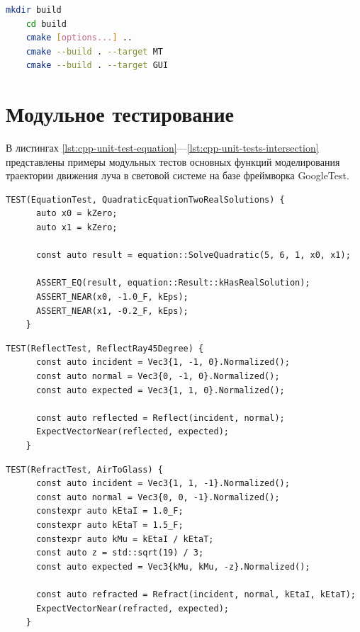 \begin{lstlisting}[gobble=8, language=bash, caption={Сборка\label{lst:cmake}}]
	mkdir build
	cd build
	cmake [options...] ..
	cmake --build . --target MT
	cmake --build . --target GUI
\end{lstlisting}

\section{Модульное тестирование}

В листингах \ref{lst:cpp-unit-test-equation}—\ref{lst:cpp-unit-tests-intersection} представлены примеры модульных тестов основных функций моделирования траектории движения луча в световой системе на базе фреймворка GoogleTest.

\begin{lstlisting}[gobble=8, language=C++23, caption={Юнит-тест функции решения квадратных уравнений\label{lst:cpp-unit-test-equation}}]
	TEST(EquationTest, QuadraticEquationTwoRealSolutions) {
	  auto x0 = kZero;
	  auto x1 = kZero;

	  const auto result = equation::SolveQuadratic(5, 6, 1, x0, x1);

	  ASSERT_EQ(result, equation::Result::kHasRealSolution);
	  ASSERT_NEAR(x0, -1.0_F, kEps);
	  ASSERT_NEAR(x1, -0.2_F, kEps);
	}
\end{lstlisting}

\begin{lstlisting}[gobble=8, language=C++23, caption={Юнит-тест функции отражения\label{lst:cpp-unit-test-reflection}}]
	TEST(ReflectTest, ReflectRay45Degree) {
	  const auto incident = Vec3{1, -1, 0}.Normalized();
	  const auto normal = Vec3{0, -1, 0}.Normalized();
	  const auto expected = Vec3{1, 1, 0}.Normalized();

	  const auto reflected = Reflect(incident, normal);
	  ExpectVectorNear(reflected, expected);
	}
\end{lstlisting}

\begin{lstlisting}[gobble=8, language=C++23, caption={Юнит-тест функции преломления\label{lst:cpp-unit-test-refraction}}]
	TEST(RefractTest, AirToGlass) {
	  const auto incident = Vec3{1, 1, -1}.Normalized();
	  const auto normal = Vec3{0, 0, -1}.Normalized();
	  constexpr auto kEtaI = 1.0_F;
	  constexpr auto kEtaT = 1.5_F;
	  constexpr auto kMu = kEtaI / kEtaT;
	  const auto z = std::sqrt(19) / 3;
	  const auto expected = Vec3{kMu, kMu, -z}.Normalized();

	  const auto refracted = Refract(incident, normal, kEtaI, kEtaT);
	  ExpectVectorNear(refracted, expected);
	}
\end{lstlisting}

